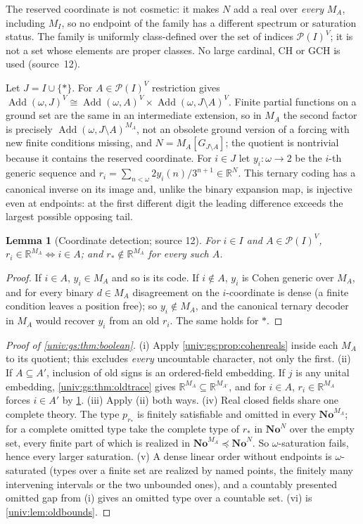 \documentclass[11pt,letterpaper]{article}
\numberwithin{equation}{section}
\newtheorem{lemma}[lemma]{Lemma}
\theoremstyle{definition}
\theoremstyle{remark}
\newcommand{\No}{\mathbf{No}}
\newcommand{\NoN}{\No^{N}}
\newcommand{\R}{\mathbb R}
\newcommand{\Pow}{\mathcal P}
\newcommand{\Add}{\operatorname{Add}}
\begin{document}
The reserved coordinate is not cosmetic: it makes $N$ add a real over \emph{every} $M_A$,
including $M_I$, so no endpoint of the family has a different spectrum or saturation status.
The family is uniformly class-defined over the set of indices $\Pow(I)^V$; it is not a set
whose elements are proper classes. No large cardinal, CH or GCH is used (source~12).

Let $J=I\cup\{*\}$. For $A\in\Pow(I)^V$ restriction gives
$\Add(\omega,J)^V\cong\Add(\omega,A)^V\times\Add(\omega,J\setminus A)^V$. Finite partial functions
on a ground set are the same in an intermediate extension, so in $M_A$ the second factor is
precisely $\Add(\omega,J\setminus A)^{M_A}$, not an obsolete ground version of a forcing with
new finite conditions missing, and $N=M_A[G_{J\setminus A}]$; the quotient is nontrivial
because it contains the reserved coordinate. For $i\in J$ let $y_i:\omega\to2$ be the $i$-th
generic sequence and $r_i=\sum_{n<\omega}2y_i(n)/3^{n+1}\in\R^N$. This ternary coding has a
canonical inverse on its image and, unlike the binary expansion map, is injective even at
endpoints: at the first different digit the leading difference exceeds the largest possible
opposing tail.

\begin{lemma}[Coordinate detection; source 12]\label{univ:gs:lem:detection}
For $i\in I$ and $A\in\Pow(I)^V$, $r_i\in\R^{M_A}\iff i\in A$; and $r_*\notin\R^{M_A}$ for
every such $A$.
\end{lemma}
\begin{proof}
If $i\in A$, $y_i\in M_A$ and so is its code. If $i\notin A$, $y_i$ is Cohen generic over
$M_A$, and for every binary $d\in M_A$ disagreement on the $i$-coordinate is dense (a finite
condition leaves a position free); so $y_i\notin M_A$, and the canonical ternary decoder in
$M_A$ would recover $y_i$ from an old $r_i$. The same holds for $*$.
\end{proof}

\begin{proof}[Proof of \cref{univ:gs:thm:boolean}]
(i) Apply \cref{univ:gs:prop:cohenreals} inside each $M_A$ to its quotient; this excludes
\emph{every} uncountable character, not only the first. (ii) If $A\subseteq A'$, inclusion of
old signs is an ordered-field embedding. If $j$ is any unital embedding,
\cref{univ:gs:thm:oldtrace} gives $\R^{M_A}\subseteq\R^{M_{A'}}$, and for $i\in A$,
$r_i\in\R^{M_A}$ forces $i\in A'$ by \cref{univ:gs:lem:detection}. (iii) Apply (ii) both ways.
(iv) Real closed fields share one complete theory. The type $p_{r_*}$ is finitely satisfiable
and omitted in every $\No^{M_A}$; for a complete omitted type take the complete type of $r_*$ in
$\NoN$ over the empty set, every finite part of which is realized in $\No^{M_A}\preccurlyeq\NoN$.
So $\omega$-saturation fails, hence every larger saturation. (v) A dense linear order without
endpoints is $\omega$-saturated (types over a finite set are realized by named points, the
finitely many intervening intervals or the two unbounded ones), and a countably presented
omitted gap from (i) gives an omitted type over a countable set. (vi) is
\cref{univ:lem:oldbounds}.
\end{proof}
\end{document}
